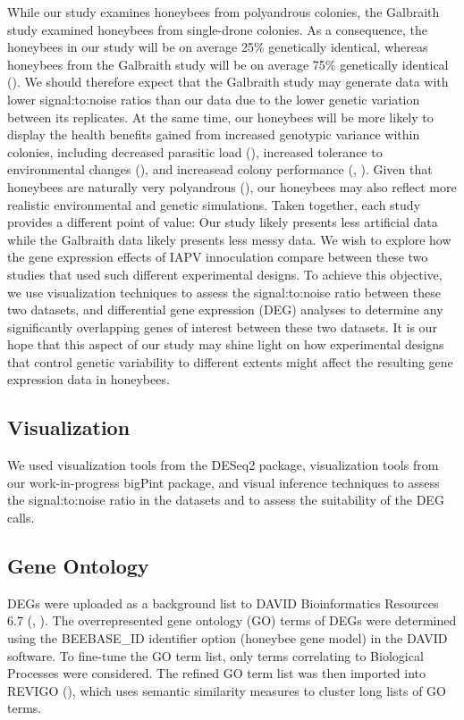 \documentclass[11pt,a4paper,oldfontcommands,openany]{memoir}
\numberwithin{equation}{section} %
\begin{document}
While our study examines honeybees from polyandrous colonies, the Galbraith study examined honeybees from single-drone colonies. As a consequence, the honeybees in our study will be on average 25\% genetically identical, whereas honeybees from the Galbraith study will be on average 75\% genetically identical (\citealt{sisters}). We should therefore expect that the Galbraith study may generate data with lower signal:to:noise ratios than our data due to the lower genetic variation between its replicates. At the same time, our honeybees will be more likely to display the health benefits gained from increased genotypic variance within colonies, including decreased parasitic load (\citealt{multParasite}), increased tolerance to environmental changes (\citealt{divHyp2}), and increasead colony performance (\citealt{geneticDiverse}, \citealt{geneticDiverse2}). Given that honeybees are naturally very polyandrous (\citealt{patriline}), our honeybees may also reflect more realistic environmental and genetic simulations. Taken together, each study provides a different point of value: Our study likely presents less artificial data while the Galbraith data likely presents less messy data. We wish to explore how the gene expression effects of IAPV innoculation compare between these two studies that used such different experimental designs. To achieve this objective, we use visualization techniques to assess the signal:to:noise ratio between these two datasets, and differential gene expression (DEG) analyses to determine any significantly overlapping genes of interest between these two datasets. It is our hope that this aspect of our study may shine light on how experimental designs that control genetic variability to different extents might affect the resulting gene expression data in honeybees.

\subsection{Visualization}

We used visualization tools from the DESeq2 package, visualization tools from our work-in-progress bigPint package, and visual inference techniques to assess the signal:to:noise ratio in the datasets and to assess the suitability of the DEG calls. 

\subsection{Gene Ontology}

DEGs were uploaded as a background list to DAVID Bioinformatics Resources 6.7 (\citealt{davidBio}, \citealt{davidBio2}). The overrepresented gene ontology (GO) terms of DEGs were determined using the BEEBASE\_ID identifier option (honeybee gene model) in the DAVID software. To fine-tune the GO term list, only terms correlating to Biological Processes were considered. The refined GO term list was then imported into REVIGO (\citealt{revigo}), which uses semantic similarity measures to cluster long lists of GO terms.
\end{document}
